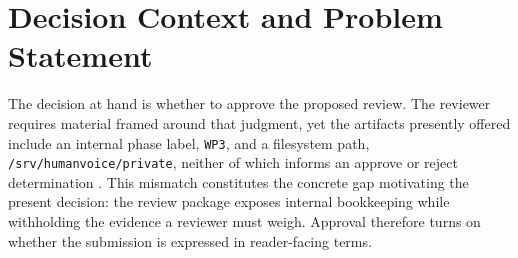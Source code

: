\section{Decision Context and Problem Statement}

The decision at hand is whether to approve the proposed review. The reviewer requires material framed around that judgment, yet the artifacts presently offered include an internal phase label, \texttt{WP3}, and a filesystem path, \texttt{/srv/humanvoice/private}, neither of which informs an approve or reject determination \cite{source001}. This mismatch constitutes the concrete gap motivating the present decision: the review package exposes internal bookkeeping while withholding the evidence a reviewer must weigh. Approval therefore turns on whether the submission is expressed in reader-facing terms.